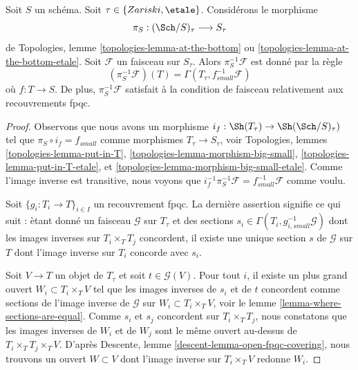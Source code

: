 \begin{lemma}
\label{lemma-describe-pullback}
Soit $S$ un sch\'ema. Soit $\tau \in \{Zariski, \etale\}$. Consid\'erons le morphisme
$$
\pi_S : (\Sch/S)_\tau \longrightarrow S_\tau
$$
de Topologies, lemme \ref{topologies-lemma-at-the-bottom} ou
\ref{topologies-lemma-at-the-bottom-etale}. Soit $\mathcal{F}$ un faisceau sur
$S_\tau$. Alors $\pi_S^{-1}\mathcal{F}$ est donn\'e par la r\`egle
$$
(\pi_S^{-1}\mathcal{F})(T) = \Gamma(T_\tau, f_{small}^{-1}\mathcal{F})
$$
o\`u $f : T \to S$. De plus, $\pi_S^{-1}\mathcal{F}$ satisfait \`a la
condition de faisceau relativement aux recouvrements fpqc.
\end{lemma}

\begin{proof}
Observons que nous avons un morphisme $i_f : \Sh(T_\tau) \to \Sh(\Sch/S)_\tau)$
tel que $\pi_S \circ i_f = f_{small}$ comme morphismes
$T_\tau \to S_\tau$, voir
Topologies, lemmes \ref{topologies-lemma-put-in-T},
\ref{topologies-lemma-morphism-big-small},
\ref{topologies-lemma-put-in-T-etale}, et
\ref{topologies-lemma-morphism-big-small-etale}.
Comme l'image inverse est transitive, nous voyons que
$i_f^{-1} \pi_S^{-1}\mathcal{F} = f_{small}^{-1}\mathcal{F}$ comme voulu.

\medskip\noindent
Soit $\{g_i : T_i \to T\}_{i \in I}$ un recouvrement fpqc.
La derni\`ere assertion signifie ce qui suit : \`etant donn\'e un faisceau $\mathcal{G}$
sur $T_\tau$ et des sections
$s_i \in \Gamma(T_i, g_{i, small}^{-1}\mathcal{G})$ dont les images inverses
sur $T_i \times_T T_j$ concordent, il existe une unique section $s$ de $\mathcal{G}$
sur $T$ dont l'image inverse sur $T_i$ concorde avec $s_i$.

\medskip\noindent
Soit $V \to T$ un objet de $T_\tau$ et soit $t \in \mathcal{G}(V)$.
Pour tout $i$, il existe un plus grand ouvert $W_i \subset T_i \times_T V$
tel que les images inverses de $s_i$ et de $t$ concordent comme sections de l'image
inverse de $\mathcal{G}$ sur $W_i \subset T_i \times_T V$, voir le
lemme \ref{lemma-where-sections-are-equal}.
Comme $s_i$ et $s_j$ concordent sur $T_i \times_T T_j$, nous constatons
que les images inverses de $W_i$ et de $W_j$ sont le m\^eme ouvert au-dessus de
$T_i \times_T T_j \times_T V$. D'apr\`es
Descente, lemme \ref{descent-lemma-open-fpqc-covering},
nous trouvons un ouvert $W \subset V$ dont l'image inverse sur $T_i \times_T V$
redonne $W_i$.


\end{proof}
